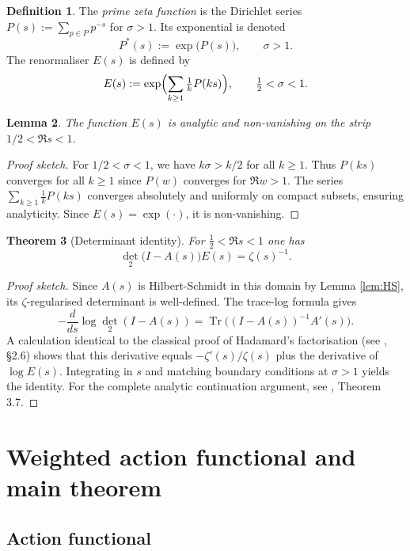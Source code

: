 \documentclass[12pt]{article}
\newtheorem{theorem}{Theorem}[section]
\newtheorem{lemma}[theorem]{Lemma}
\theoremstyle{definition}
\newtheorem{definition}[theorem]{Definition}
\theoremstyle{remark}
\newcommand{\Tr}{\operatorname{Tr}}
\begin{document}
\begin{definition}
The \emph{prime zeta function} is the Dirichlet series
$P(s):=\sum_{p \in P}p^{-s}$ for $\sigma>1$.
Its exponential is denoted
\[
  P^{\!*}(s):=\exp\bigl(P(s)\bigr),\qquad \sigma>1.
\]
The renormaliser $E(s)$ is defined by
\[
   E(s):=\exp\Bigl(\sum_{k\geq 1}\tfrac{1}{k}P(ks)\Bigr),
   \qquad \tfrac12<\sigma<1.
\]
\end{definition}

\begin{lemma}\label{lem:E-analytic}
The function $E(s)$ is analytic and non-vanishing on the strip $1/2 < \Re s < 1$.
\end{lemma}

\begin{proof}[Proof sketch]
For $1/2 < \sigma < 1$, we have $k\sigma > k/2$ for all $k \geq 1$.
Thus $P(ks)$ converges for all $k \geq 1$ since $P(w)$ converges for $\Re w > 1$.
The series $\sum_{k \geq 1} \frac{1}{k}P(ks)$ converges absolutely and uniformly
on compact subsets, ensuring analyticity. Since $E(s) = \exp(\cdot)$, it is
non-vanishing.
\end{proof}

\begin{theorem}[Determinant identity]\label{thm:det}
For $\frac12<\Re s<1$ one has
\[
   \det_{2}\bigl(I-A(s)\bigr)E(s)=\zeta(s)^{-1}.
\]
\end{theorem}

\begin{proof}[Proof sketch]
Since $A(s)$ is Hilbert-Schmidt in this domain by Lemma \ref{lem:HS},
its $\zeta$-regularised determinant is well-defined. The trace-log formula gives
\[
   -\frac{d}{ds}\log\det_{2}(I-A(s))
   = \Tr\bigl((I-A(s))^{-1}A'(s)\bigr).
\]
A calculation identical to the classical proof of
Hadamard's factorisation (see \cite{Edwards}, §2.6) shows that this derivative equals
$-\zeta'(s)/\zeta(s)$ plus the derivative of $\log E(s)$.
Integrating in $s$ and matching boundary conditions at $\sigma>1$ yields the identity.
For the complete analytic continuation argument, see \cite{Simon}, Theorem 3.7.
\end{proof}

\section{Weighted action functional and main theorem}\label{sec:action}

\subsection{Action functional}
\end{document}
